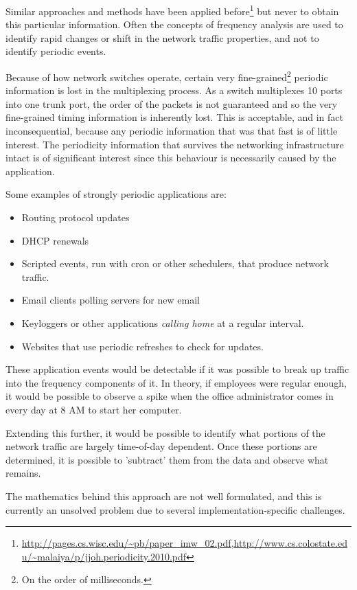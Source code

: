 \documentclass{article}
\theoremstyle{remark}
\theoremstyle{definition}
\theoremstyle{definition}
\theoremstyle{definition}
\begin{document}
Similar approaches and methods have been applied before\footnote{\url{http://pages.cs.wisc.edu/~pb/paper_imw_02.pdf},\url{http://www.cs.colostate.edu/~malaiya/p/jjoh.periodicity.2010.pdf}} but never to obtain this particular information. Often the concepts of frequency analysis are used to identify rapid changes or shift in the network traffic properties, and not to identify periodic events.

Because of how network switches operate, certain very fine-grained\footnote{On the order of milliseconds.} periodic information is lost in the multiplexing process. As a switch multiplexes 10 ports into one trunk port, the order of the packets is not guaranteed and so the very fine-grained timing information is inherently lost. This is acceptable, and in fact inconsequential, because any periodic information that was that fast is of little interest. The periodicity information that survives the networking infrastructure intact is of significant interest since this behaviour is necessarily caused by the application.

Some examples of strongly periodic applications are:

\begin{itemize}
\item Routing protocol updates
\item DHCP renewals
\item Scripted events, run with cron or other schedulers, that produce network traffic.
\item Email clients polling servers for new email
\item Keyloggers or other applications \emph{calling home} at a regular interval.
\item Websites that use periodic refreshes to check for updates.
\end{itemize}

These application events would be detectable if it was possible to break up traffic into the frequency components of it. In theory, if employees were regular enough, it would be possible to observe a spike when the office administrator comes in every day at 8 AM to start her computer.

Extending this further, it would be possible to identify what portions of the network traffic are largely time-of-day dependent. Once these portions are determined, it is possible to 'subtract' them from the data and observe what remains.

The mathematics behind this approach are not well formulated, and this is currently an unsolved problem due to several implementation-specific challenges.
\end{document}
